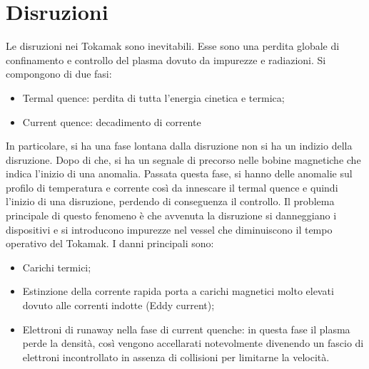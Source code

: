 \documentclass{article}
\begin{document}
\section{Disruzioni}
Le disruzioni nei Tokamak sono inevitabili. Esse sono una perdita globale di confinamento e controllo del plasma dovuto da impurezze e radiazioni.\newline
Si compongono di due fasi:
\begin{itemize}
	\item Termal quence: perdita di tutta l'energia cinetica e termica;
	\item Current quence: decadimento di corrente
\end{itemize}
In particolare, si ha una fase lontana dalla disruzione non si ha un indizio della disruzione. Dopo di che, si ha un segnale di precorso nelle bobine magnetiche che indica l'inizio di una anomalia. Passata questa fase, si hanno delle anomalie sul profilo di temperatura e corrente così da innescare il termal quence e quindi l'inizio di una disruzione, perdendo di conseguenza il controllo.\newline
Il problema principale di questo fenomeno è che avvenuta la disruzione si danneggiano i dispositivi e si introducono impurezze nel vessel che diminuiscono il tempo operativo del Tokamak. I danni principali sono:
\begin{itemize}
	\item Carichi termici;
	\item Estinzione della corrente rapida porta a carichi magnetici molto elevati dovuto alle correnti indotte (Eddy current);
	\item Elettroni di runaway nella fase di current quenche: in questa fase il plasma perde la densità, così vengono accellarati notevolmente divenendo un fascio di elettroni incontrollato in assenza di collisioni per limitarne la velocità.
\end{itemize}
\end{document}
